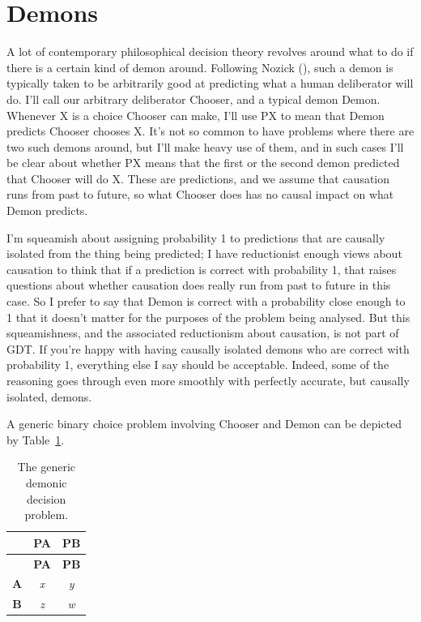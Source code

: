 \documentclass[
  12pt,
  letterpaper,
  DIV=11,
  numbers=noendperiod]{scrreprt}
\begin{document}
\section{Demons}\label{sec-intro-demons}

A lot of contemporary philosophical decision theory revolves around what
to do if there is a certain kind of demon around. Following Nozick
(), such a demon is typically taken to be
arbitrarily good at predicting what a human deliberator will do. I'll
call our arbitrary deliberator Chooser, and a typical demon Demon.
Whenever X is a choice Chooser can make, I'll use PX to mean that Demon
predicts Chooser chooses X. It's not so common to have problems where
there are two such demons around, but I'll make heavy use of them, and
in such cases I'll be clear about whether PX means that the first or the
second demon predicted that Chooser will do X. These are predictions,
and we assume that causation runs from past to future, so what Chooser
does has no causal impact on what Demon predicts.

I'm squeamish about assigning probability 1 to predictions that are
causally isolated from the thing being predicted; I have reductionist
enough views about causation to think that if a prediction is correct
with probability 1, that raises questions about whether causation does
really run from past to future in this case. So I prefer to say that
Demon is correct with a probability close enough to 1 that it doesn't
matter for the purposes of the problem being analysed. But this
squeamishness, and the associated reductionism about causation, is not
part of GDT. If you're happy with having causally isolated demons who
are correct with probability 1, everything else I say should be
acceptable. Indeed, some of the reasoning goes through even more
smoothly with perfectly accurate, but causally isolated, demons.

A generic binary choice problem involving Chooser and Demon can be
depicted by Table~\ref{tbl-gen-dem-problem-text}.

\begin{longtable}[]{@{}ccc@{}}
\caption{The generic demonic decision
problem.}\label{tbl-gen-dem-problem-text}\tabularnewline
\toprule\noalign{}
& \textbf{PA} & \textbf{PB} \\
\midrule\noalign{}
\endfirsthead
\toprule\noalign{}
& \textbf{PA} & \textbf{PB} \\
\midrule\noalign{}
\endhead
\bottomrule\noalign{}
\endlastfoot
\textbf{A} & \emph{x} & \emph{y} \\
\textbf{B} & \emph{z} & \emph{w} \\
\end{longtable}
\end{document}
